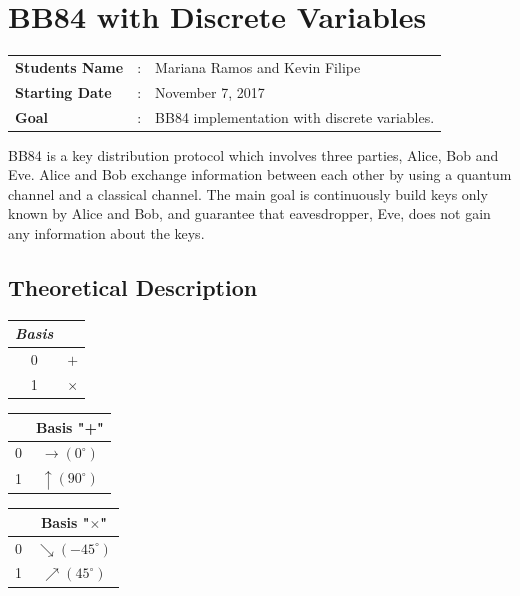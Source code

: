\clearpage
\section{BB84 with Discrete Variables}

\begin{tcolorbox}	
\begin{tabular}{p{2.75cm} p{0.2cm} p{10.5cm}} 	
\textbf{Students Name}  &:& Mariana Ramos and Kevin Filipe\\
\textbf{Starting Date} &:& November 7, 2017\\
\textbf{Goal}          &:& BB84 implementation with discrete variables.
\end{tabular}
\end{tcolorbox}

BB84 is a key distribution protocol which involves three parties, Alice, Bob and Eve. Alice and Bob exchange information between each other by using a quantum channel and a classical channel. The main goal is continuously build keys only known by Alice and Bob, and guarantee that eavesdropper, Eve, does not gain any information about the keys.



\subsection{Theoretical Description}

\begin{table}[H]
\centering
\begin{tabular}{c|c}
\textbf{\textit{Basis}}         &  \\ \hline
 0 & $+$ \\
 1 & $\times$ \\
\end{tabular}
\end{table}


\begin{table}[H]
\centering
\begin{tabular}{c|c}
            & Basis "+" \\ \hline
 0 & $\to (0^{\circ})$ \\
 1 & $\uparrow (90^{\circ})$ \\
\end{tabular}
\end{table}


\begin{table}[H]
\centering
\begin{tabular}{c|c}
      & Basis "$\times$" \\ \hline
 0 & $\searrow (-45^{\circ})$ \\
 1 & $\nearrow (45^{\circ})$ \\
\end{tabular}
\end{table}


